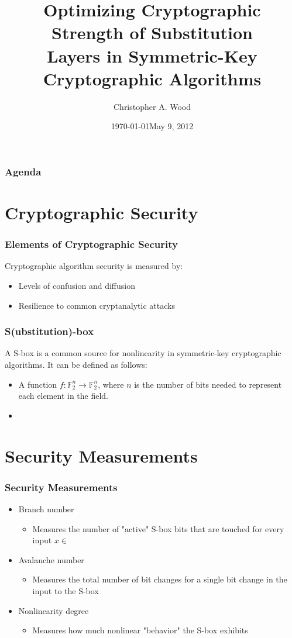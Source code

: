 \documentclass[handout]{beamer}
\title[Optimizing Cryptographic Algorithm Strength]{Optimizing Cryptographic Strength of Substitution\\ Layers in Symmetric-Key Cryptographic Algorithms}
\institute[RIT]{}
\date{\today}
\author{Christopher A. Wood}
\date{May 9, 2012}
\newcommand{\field}[1]{\mathbb{#1}} %
\begin{document}

\begin{frame}
	\titlepage
\end{frame}

\begin{frame}
	\frametitle{Agenda}
	\tableofcontents
\end{frame}

\section{Cryptographic Security}
\begin{frame}
	\frametitle{Elements of Cryptographic Security}
	Cryptographic algorithm security is measured by:
	\begin{itemize}
		\item Levels of confusion and diffusion
		\item Resilience to common cryptanalytic attacks
	\end{itemize}
\end{frame}

\begin{frame}
	\frametitle{S(ubstitution)-box}
	A S-box is a common source for nonlinearity in symmetric-key cryptographic algorithms. It can be defined as follows:
	\begin{itemize}
		\item A function $f : \field{F}_2^n \to \field{F}_2^n$, where $n$ is the number of bits needed to represent each element in the field.
		\item 
	\end{itemize}
\end{frame}

\section{Security Measurements}
\begin{frame}
	\frametitle{Security Measurements}
	\begin{itemize}
		\item Branch number
		\begin{itemize}
			\item Measures the number of "active" S-box bits that are touched for every input $x \in $
		\end{itemize}
		\item Avalanche number
		\begin{itemize}
			\item Measures the total number of bit changes for a single bit change in the input to the S-box
		\end{itemize}
		\item Nonlinearity degree
		\begin{itemize}
			\item Measures how much nonlinear "behavior" the S-box exhibits
		\end{itemize}
	\end{itemize}
\end{frame}
\end{document}
